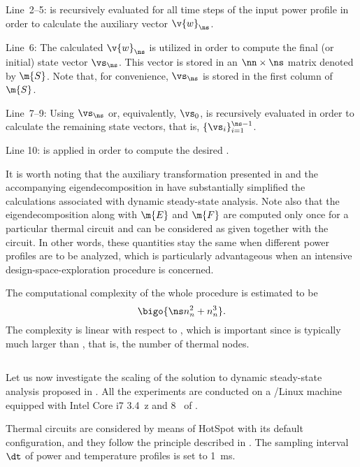 Line~2--5:  is recursively
evaluated for all time steps of the input power profile \mp in order to
calculate the auxiliary vector $\v{w}_\ns$.

Line~6: The calculated $\v{w}_\ns$ is utilized in order to compute the final (or
initial) state vector $\vs_\ns$. This vector is stored in an $\nn \times \ns$
matrix denoted by $\m{S}$. Note that, for convenience, $\vs_\ns$ is stored in
the first column of $\m{S}$.

Line~7--9: Using $\vs_\ns$ or, equivalently, $\vs_0$,
 is recursively evaluated in order to
calculate the remaining state vectors, that is, $\{ \vs_i \}_{i = 1}^{\ns - 1}$.

Line 10:  is applied in order to compute the desired
\mq.

It is worth noting that the auxiliary transformation presented in
 and the accompanying eigendecomposition in
 have substantially simplified the calculations
associated with dynamic steady-state analysis. Note also that the
eigendecomposition along with $\m{E}$ and $\m{F}$ are computed only once for a
particular thermal  circuit and can be considered as given together with
the circuit. In other words, these quantities stay the same when different power
profiles are to be analyzed, which is particularly advantageous when an
intensive design-space-exploration procedure is concerned.

The computational complexity of the whole procedure is estimated to be
\[
  \bigo{\ns n_n^2 + n_n^3}.
\]
The complexity is linear with respect to \ns, which is important since \ns is
typically much larger than \nn, that is, the number of thermal nodes.

\subsection{\resultstitle}

Let us now investigate the scaling of the solution to dynamic steady-state
analysis proposed in . All the experiments
are conducted on a /Linux machine equipped with Intel Core i7
3.4~z and 8~ of .

Thermal  circuits are considered by means of HotSpot \cite{skadron2003}
with its default configuration, and they follow the principle described in
. The sampling interval $\dt$ of power and temperature
profiles is set to 1~ms.

